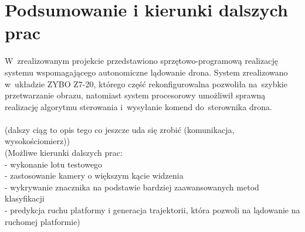 \chapter{Podsumowanie i kierunki dalszych prac}
\label{cha:Podsumowanie i kierunki dalszych prac}
W~zrealizowanym projekcie przedstawiono sprzętowo-programową realizację systemu wspomagającego autonomiczne lądowanie drona. System zrealizowano w~układzie ZYBO Z7-20, którego część rekonfigurowalna pozwoliła na~szybkie przetwarzanie obrazu, natomiast system procesorowy umożliwił sprawną realizację algorytmu sterowania i~wysyłanie komend do~sterownika drona. \\\\
(dalszy ciąg to opis tego co jeszcze uda się zrobić (komunikacja, wysokościomierz)) \\
(Możliwe kierunki dalszych prac: \\
- wykonanie lotu testowego\\
- zastosowanie kamery o większym kącie widzenia\\
- wykrywanie znacznika na podstawie bardziej zaawansowanych metod klasyfikacji\\
- predykcja ruchu platformy i generacja trajektorii, która pozwoli na lądowanie na ruchomej platformie)

